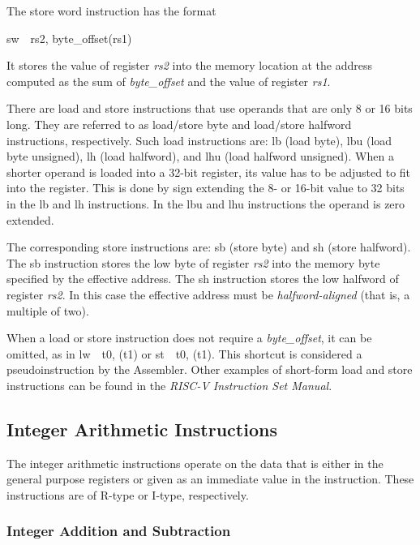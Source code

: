 \documentclass[11pt, twoside, pdftex]{article}
\begin{document}
The store word instruction has the format
\vspace{-\baselineskip}
\begin{center}
{\sf sw~~rs2, byte\_offset(rs1)}
\end{center}
\noindent 
It stores the value of register {\it rs2} into the memory location at the address
computed as the sum of {\it byte\_offset} and the value of register {\it rs1}. 
 
There are load and store instructions that use operands that are only 8 or 16 bits long.
They are referred to as load/store byte and load/store halfword instructions, respectively.
Such load instructions are: {\sf lb} (load byte), {\sf lbu} (load byte unsigned),
{\sf lh} (load halfword), and {\sf lhu} (load halfword unsigned). 
When a shorter operand is loaded into a 32-bit register, its value has to be adjusted
to fit into the register. This is done by sign extending the 8- or 16-bit value to 32 bits
in the {\sf lb} and {\sf lh} instructions. In the {\sf lbu} and {\sf lhu} instructions
the operand is zero extended.

The corresponding store instructions are: {\sf sb} (store byte) and {\sf sh} (store halfword).
The {\sf sb} instruction stores the low byte of register {\it rs2} into the memory byte
specified by the effective address. The {\sf sh} instruction stores the low halfword
of register {\it rs2}. In this case the effective address must be {\it halfword-aligned}
(that is, a multiple of two).

When a load or store instruction does not require a {\it byte\_offset}, it can be omitted,
as in {\sf lw~~t0, (t1)} or {\sf st~~t0, (t1)}. This shortcut is considered a
pseudoinstruction by the Assembler. Other examples of short-form load and store
instructions can be found in the {\it RISC-V Instruction Set Manual}.

\subsection{Integer Arithmetic Instructions}

The integer arithmetic instructions operate on the data that is either in the general purpose 
registers or given as an immediate value in the instruction. These instructions are of 
R-type or I-type, respectively.

\subsubsection{Integer Addition and Subtraction}
\label{sec:addsub}
\end{document}

